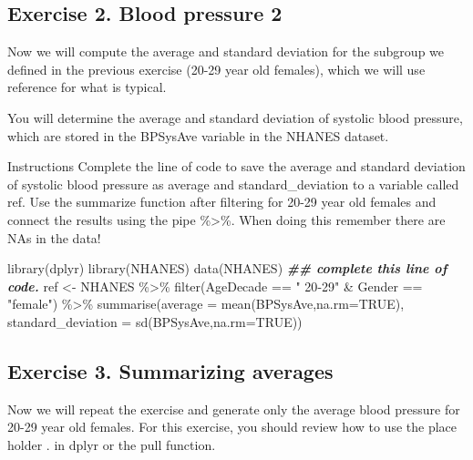 \documentclass[
]{article}
\newenvironment{Shaded}{\begin{snugshade}}{\end{snugshade}}
\newcommand{\AttributeTok}[1]{\textcolor[rgb]{0.77,0.63,0.00}{#1}}
\newcommand{\ConstantTok}[1]{\textcolor[rgb]{0.00,0.00,0.00}{#1}}
\newcommand{\DocumentationTok}[1]{\textcolor[rgb]{0.56,0.35,0.01}{\textbf{\textit{#1}}}}
\newcommand{\FunctionTok}[1]{\textcolor[rgb]{0.00,0.00,0.00}{#1}}
\newcommand{\NormalTok}[1]{#1}
\newcommand{\OtherTok}[1]{\textcolor[rgb]{0.56,0.35,0.01}{#1}}
\newcommand{\SpecialCharTok}[1]{\textcolor[rgb]{0.00,0.00,0.00}{#1}}
\newcommand{\StringTok}[1]{\textcolor[rgb]{0.31,0.60,0.02}{#1}}
\begin{document}
\hypertarget{exercise-2.-blood-pressure-2}{%
\subsection{Exercise 2. Blood pressure
2}\label{exercise-2.-blood-pressure-2}}

Now we will compute the average and standard deviation for the subgroup
we defined in the previous exercise (20-29 year old females), which we
will use reference for what is typical.

You will determine the average and standard deviation of systolic blood
pressure, which are stored in the BPSysAve variable in the NHANES
dataset.

Instructions Complete the line of code to save the average and standard
deviation of systolic blood pressure as average and standard\_deviation
to a variable called ref. Use the summarize function after filtering for
20-29 year old females and connect the results using the pipe
\%\textgreater\%. When doing this remember there are NAs in the data!

\begin{Shaded}
\begin{Highlighting}[]
\FunctionTok{library}\NormalTok{(dplyr)}
\FunctionTok{library}\NormalTok{(NHANES)}
\FunctionTok{data}\NormalTok{(NHANES)}
\DocumentationTok{\#\# complete this line of code.}
\NormalTok{ref }\OtherTok{\textless{}{-}}\NormalTok{ NHANES }\SpecialCharTok{\%\textgreater{}\%} \FunctionTok{filter}\NormalTok{(AgeDecade }\SpecialCharTok{==} \StringTok{" 20{-}29"} \SpecialCharTok{\&}\NormalTok{ Gender }\SpecialCharTok{==} \StringTok{"female"}\NormalTok{) }\SpecialCharTok{\%\textgreater{}\%} \FunctionTok{summarise}\NormalTok{(}\AttributeTok{average =} \FunctionTok{mean}\NormalTok{(BPSysAve,}\AttributeTok{na.rm=}\ConstantTok{TRUE}\NormalTok{), }\AttributeTok{standard\_deviation =} \FunctionTok{sd}\NormalTok{(BPSysAve,}\AttributeTok{na.rm=}\ConstantTok{TRUE}\NormalTok{))}
\end{Highlighting}
\end{Shaded}

\hypertarget{exercise-3.-summarizing-averages}{%
\subsection{Exercise 3. Summarizing
averages}\label{exercise-3.-summarizing-averages}}

Now we will repeat the exercise and generate only the average blood
pressure for 20-29 year old females. For this exercise, you should
review how to use the place holder . in dplyr or the pull function.
\end{document}
